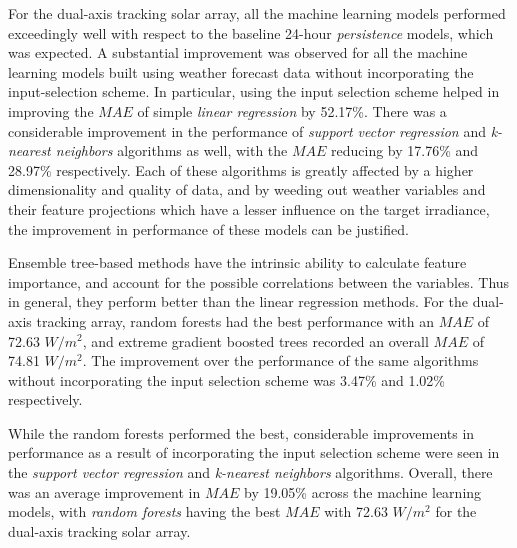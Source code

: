 \par For the dual-axis tracking solar array, all the machine learning models performed exceedingly well with respect to the baseline 24-hour \textit{persistence} models, which was expected. A substantial improvement was observed for all the machine learning models built using weather forecast data without incorporating the input-selection scheme. In particular, using the input selection scheme helped in improving the $MAE$ of simple \textit{linear regression} by 52.17\%. There was a considerable improvement in the performance of \textit{support vector regression} and \textit{k-nearest neighbors} algorithms as well, with the $MAE$ reducing by 17.76\% and 28.97\% respectively. Each of these algorithms is greatly affected by a higher dimensionality and quality of data, and by weeding out weather variables and their feature projections which have a lesser influence on the target irradiance, the improvement in performance of these models can be justified.   

\par Ensemble tree-based methods have the intrinsic ability to calculate feature importance, and account for the possible correlations between the variables. Thus in general, they perform better than the linear regression methods. For the dual-axis tracking array, random forests had the best performance with an $MAE$ of 72.63 $W/m^2$, and extreme gradient boosted trees recorded an overall $MAE$ of 74.81 $W/m^2$. The improvement over the performance of the same algorithms without incorporating the input selection scheme was 3.47\% and 1.02\% respectively.

\par While the random forests performed the best, considerable improvements in performance as a result of incorporating the input selection scheme were seen in the \textit{support vector regression} and \textit{k-nearest neighbors} algorithms. Overall, there was an average improvement in $MAE$ by 19.05\% across the machine learning models, with \textit{random forests} having the best $MAE$ with 72.63 $W/m^2$ for the dual-axis tracking solar array.

